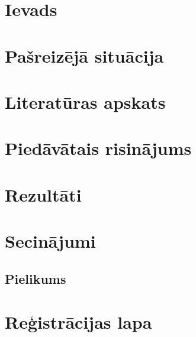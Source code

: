 \documentclass{LU}
\begin{document}

\chapter*{Ievads} %
\pagestyle{plain}



\chapter{Pašreizējā situācija}


\chapter{Literatūras apskats}
\label{teorija}


\chapter{Piedāvātais risinājums}
\label{risinajums}


\chapter{Rezultāti}
\label{results}



\chapter*{Secinājumi}


\renewcommand{\bibname}{Izmantotā literatūra un avoti}





\begin{appendices}
\chapter*{Pielikums}

\end{appendices}


\chapter*{Reģistrācijas lapa}

\end{document}
